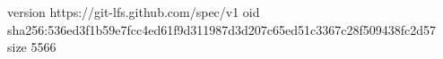 version https://git-lfs.github.com/spec/v1
oid sha256:536ed3f1b59e7fcc4ed61f9d311987d3d207c65ed51c3367c28f509438fc2d57
size 5566
